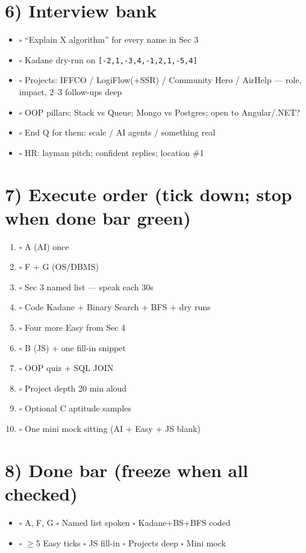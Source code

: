 \documentclass[a4paper,9pt]{extarticle}
\begin{document}
\section{6) Interview bank}
\begin{itemize}
  \item $\square$ ``Explain X algorithm'' for every name in Sec 3
  \item $\square$ Kadane dry-run on \texttt{[-2,1,-3,4,-1,2,1,-5,4]}
  \item $\square$ Projects: IFFCO / LogiFlow(+SSR) / Community Hero / AirHelp --- role, impact, 2--3 follow-ups deep
  \item $\square$ OOP pillars; Stack vs Queue; Mongo vs Postgres; open to Angular/.NET?
  \item $\square$ End Q for them: scale / AI agents / something real
  \item $\square$ HR: layman pitch; confident replies; location \#1
\end{itemize}

\section{7) Execute order (tick down; stop when done bar green)}
\begin{enumerate}
  \item $\square$ A (AI) once
  \item $\square$ F + G (OS/DBMS)
  \item $\square$ Sec 3 named list --- speak each 30s
  \item $\square$ Code Kadane + Binary Search + BFS + dry runs
  \item $\square$ Four more Easy from Sec 4
  \item $\square$ B (JS) + one fill-in snippet
  \item $\square$ OOP quiz + SQL JOIN
  \item $\square$ Project depth 20 min aloud
  \item $\square$ Optional C aptitude samples
  \item $\square$ One mini mock sitting (AI + Easy + JS blank)
\end{enumerate}

\section{8) Done bar (freeze when all checked)}
\begin{itemize}
  \item $\square$ A, F, G \quad $\square$ Named list spoken \quad $\square$ Kadane+BS+BFS coded
  \item $\square$ $\geq$5 Easy ticks \quad $\square$ JS fill-in \quad $\square$ Projects deep \quad $\square$ Mini mock
\end{itemize}

\vspace{1mm}
\end{document}
